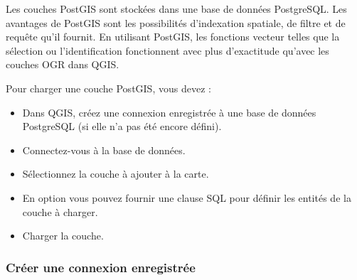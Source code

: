 Les couches PostGIS sont stock\'ees dans une base de donn\'ees PostgreSQL. Les avantages de PostGIS sont les possibilit\'es d'indexation spatiale, de filtre et de requ\^ete qu'il fournit. En utilisant PostGIS, les fonctions vecteur telles que la s\'election ou l'identification fonctionnent avec plus d'exactitude qu'avec les couches OGR dans QGIS.

Pour charger une couche PostGIS, vous devez :

\begin{itemize}
\item Dans QGIS, cr\'eez une connexion enregistr\'ee \`a une base de donn\'ees PostgreSQL (si elle n'a pas \'et\'e encore d\'efini).
\item Connectez-vous \`a la base de donn\'ees.
\item S\'electionnez la couche \`a ajouter \`a la carte.
\item En option vous pouvez fournir une clause SQL  pour d\'efinir les entit\'es de la couche \`a charger.
\item Charger la couche.
\end{itemize}

\subsubsection{Cr\'eer une connexion enregistr\'ee}\label{sec:postgis_stored}

